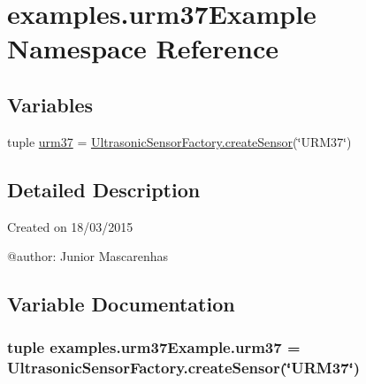 \hypertarget{namespaceexamples_1_1urm37Example}{}\section{examples.\+urm37\+Example Namespace Reference}
\label{namespaceexamples_1_1urm37Example}
\subsection*{Variables}
\begin{DoxyCompactItemize}
\item 
tuple \hyperlink{namespaceexamples_1_1urm37Example_a725cbcda6667a4a21c268032db9e19f4}{urm37} = \hyperlink{classconcretefactory_1_1ultrasonicSensorFactory_1_1UltrasonicSensorFactory_ade21ba1ce348eb9e5cf8eee3fda4a773}{Ultrasonic\+Sensor\+Factory.\+create\+Sensor}(\char`\"{}U\+R\+M37\char`\"{})
\end{DoxyCompactItemize}


\subsection{Detailed Description}
\begin{DoxyVerb}Created on 18/03/2015

@author: Junior Mascarenhas
\end{DoxyVerb}
 

\subsection{Variable Documentation}
\hypertarget{namespaceexamples_1_1urm37Example_a725cbcda6667a4a21c268032db9e19f4}{}
\subsubsection[{urm37}]{\setlength{\rightskip}{0pt plus 5cm}tuple examples.\+urm37\+Example.\+urm37 = {\bf Ultrasonic\+Sensor\+Factory.\+create\+Sensor}(\char`\"{}U\+R\+M37\char`\"{})}\label{namespaceexamples_1_1urm37Example_a725cbcda6667a4a21c268032db9e19f4}

